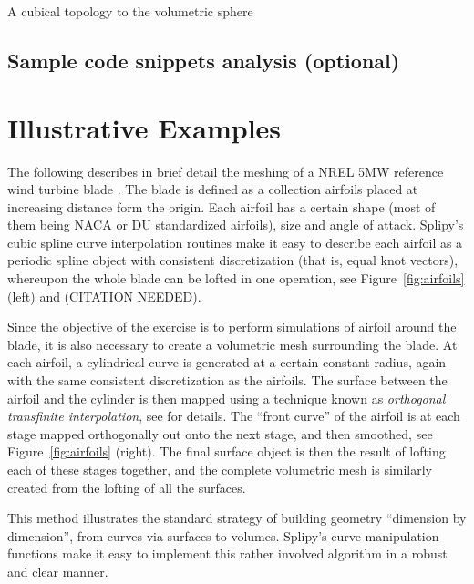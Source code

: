 \documentclass[preprint,12pt, a4paper]{elsarticle}
\begin{document}
A cubical topology to the volumetric sphere  \cite{cobb1988tts}

\subsection{Sample code snippets analysis (optional)}
\label{}

\section{Illustrative Examples}
\label{}

The following describes in brief detail the meshing of a NREL 5MW reference wind turbine blade \cite{Jonkman2009drw}.
The blade is defined as a collection airfoils placed at increasing distance form the origin.
Each airfoil has a certain shape (most of them being NACA or DU standardized airfoils), size and angle of attack.
Splipy's cubic spline curve interpolation routines make it easy to describe each airfoil as a periodic spline object with consistent discretization (that is, equal knot vectors), whereupon the whole blade can be lofted in one operation, see Figure~\ref{fig:airfoils} (left) and (CITATION NEEDED).

Since the objective of the exercise is to perform simulations of airfoil around the blade, it is also necessary to create a volumetric mesh surrounding the blade.
At each airfoil, a cylindrical curve is generated at a certain constant radius, again with the same consistent discretization as the airfoils.
The surface between the airfoil and the cylinder is then mapped using a technique known as \emph{orthogonal transfinite interpolation}, see \cite{Fonn2015sbm} for details.
The ``front curve'' of the airfoil is at each stage mapped orthogonally out onto the next stage, and then smoothed, see Figure~\ref{fig:airfoils} (right).
The final surface object is then the result of lofting each of these stages together, and the complete volumetric mesh is similarly created from the lofting of all the surfaces.

This method illustrates the standard strategy of building geometry ``dimension by dimension'', from curves via surfaces to volumes.
Splipy's curve manipulation functions make it easy to implement this rather involved algorithm in a robust and clear manner.
\end{document}
